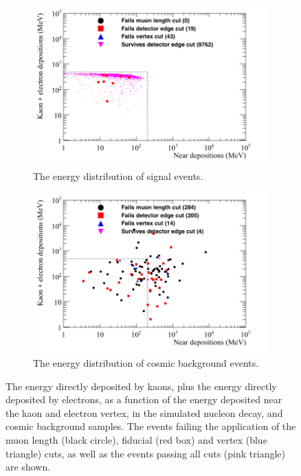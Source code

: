 \begin{figure}[h!]
  \centering
  \begin{subfigure}{0.8\textwidth}
    \includegraphics[width=\textwidth]{NucleonDecay_KaonElec_vs_Near_Can}
    \caption{The energy distribution of signal events.}
    \label{fig:NDK_KaonElec_Near_EDist_Sig}
  \end{subfigure}
  \begin{subfigure}{0.8\textwidth}
    \includegraphics[width=\textwidth]{CosmicBackground_KaonElec_vs_Near_Can}
    \caption{The energy distribution of cosmic background events.}
    \label{fig:NDK_KaonElec_Near_EDist_Cosmo}
  \end{subfigure}
  \caption[The energy directly deposited by kaons, plus the energy directly deposited by electrons, as a function of the energy deposited near the kaon and electron vertex, in the simulated nucleon decay, and cosmic background samples]
          {The energy directly deposited by kaons, plus the energy directly deposited by electrons, as a function of the energy deposited near the kaon and electron vertex, in the simulated nucleon decay, and cosmic background samples. The events failing the application of the muon length (black circle), fiducial (red box) and vertex (blue triangle) cuts, as well as the events passing all cuts (pink triangle) are shown.}
  \label{fig:NDK_KaonElec_Near_EDist}
\end{figure}

